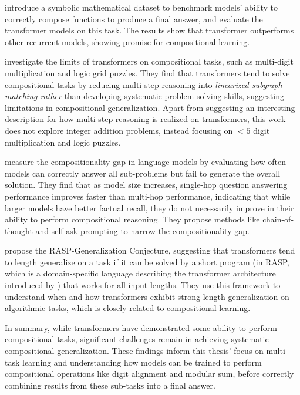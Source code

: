 \cite{saxton_analysing_2019} introduce a symbolic mathematical dataset to benchmark models' ability to correctly compose functions to produce a final answer, and evaluate the transformer models on this task. The results show that transformer outperforms other recurrent models, showing promise for compositional learning.

\cite{dziri_faith_2023} investigate the limits of transformers on compositional tasks, such as multi-digit multiplication and logic grid puzzles. They find that transformers tend to solve compositional tasks by reducing multi-step reasoning into \emph{linearized subgraph matching rather} than developing systematic problem-solving skills, suggesting limitations in compositional generalization. Apart from suggesting an interesting description for how multi-step reasoning is realized on transformers, this work does not explore integer addition problems, instead focusing on $<5$ digit multiplication and logic puzzles.

\cite{press_measuring_2023} measure the compositionality gap in language models by evaluating how often models can correctly answer all sub-problems but fail to generate the overall solution. They find that as model size increases, single-hop question answering performance improves faster than multi-hop performance, indicating that while larger models have better factual recall, they do not necessarily improve in their ability to perform compositional reasoning. They propose methods like chain-of-thought and self-ask prompting to narrow the compositionality gap.

\cite{zhou_what_2023} propose the RASP-Generalization Conjecture, suggesting that transformers tend to length generalize on a task if it can be solved by a short program (in RASP, which is a domain-specific language describing the transformer architecture introduced by \cite{weiss_thinking_2021}) that works for all input lengths. They use this framework to understand when and how transformers exhibit strong length generalization on algorithmic tasks, which is closely related to compositional learning.

In summary, while transformers have demonstrated some ability to perform compositional tasks, significant challenges remain in achieving systematic compositional generalization. These findings inform this thesis' focus on multi-task learning and understanding how models can be trained to perform compositional operations like digit alignment and modular sum, before correctly combining results from these sub-tasks into a final answer.

